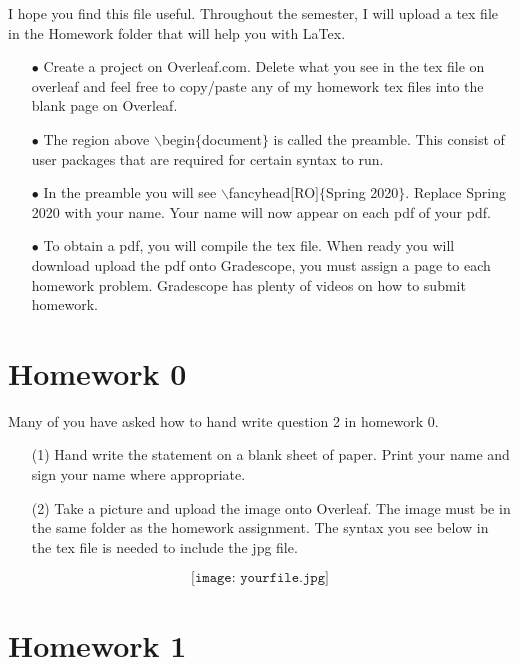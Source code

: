 \documentclass[12pt]{article}
\begin{document}
I hope you find this file useful.  Throughout the semester, I will upload a tex file in the Homework folder that will help you with LaTex.  

\begin{enumerate}
\item[$\bullet$] Create a project on Overleaf.com.  Delete what you see in the tex file on overleaf and feel free to copy/paste any of my homework tex files into the blank page on Overleaf.  
    \item [$\bullet$]  The region above $\backslash$begin$\{$document$\}$ is called the preamble. This consist of user packages that are required for certain syntax to run.  
    \item[$\bullet$] In the preamble you will see $\backslash$fancyhead$[$RO$]\{$Spring 2020$\}$.  Replace Spring 2020 with your name.  Your name will now appear on each pdf of your pdf.
    \item[$\bullet$] To obtain a pdf, you will compile the tex file.  When ready you will download upload the pdf  onto Gradescope, you must assign a page to each homework problem.  Gradescope has plenty of videos on how to submit homework.  
\end{enumerate}


\section{Homework 0}

Many of you have asked how to hand write question 2 in homework 0. 
\begin{enumerate}
    \item [(1)] Hand write the statement on a blank sheet of paper.  Print your name and sign your name where appropriate.  
    \item [(2)] Take a picture and upload the image onto Overleaf.  The image must be in the same folder as the homework assignment.  The syntax you see below in the tex file is needed to include the jpg file.    
\end{enumerate}

\[
\texttt{[image: yourfile.jpg]} %
\]

\section{Homework 1}
\end{document}
